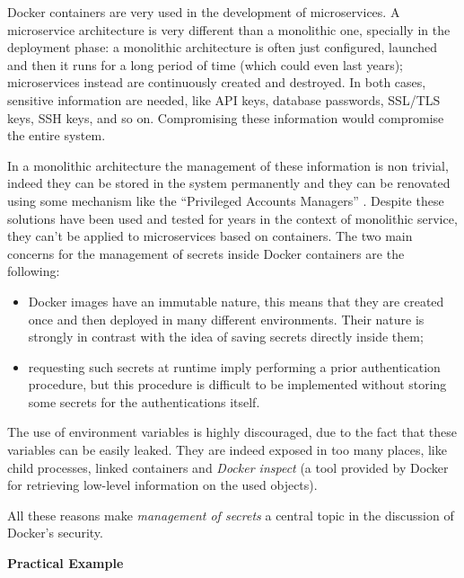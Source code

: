\documentclass[a4paper,12pt]{article}
\begin{document}
Docker containers are very used in the development of microservices. A
microservice architecture is very different than a monolithic one, specially in
the deployment phase: a monolithic architecture is often just configured,
launched and then it runs for a long period of time (which could even last
years); microservices instead are continuously created and destroyed. In both cases,
sensitive information are needed, like API keys, database passwords, SSL/TLS
keys, SSH keys, and so on. Compromising these information would compromise the entire
system. \par In a monolithic architecture the management of these information is
non trivial, indeed they can be stored in the system permanently and they can be
renovated using some mechanism like the ``Privileged Accounts Managers''
\cite{privileged_accounts_managers}. Despite these solutions have been used and
tested for years in the context of monolithic service, they can't be applied to
microservices based on containers. The two main concerns for the management of
secrets inside Docker containers are the following\cite{secret_management_concerns_docker}:
\begin{itemize}
  \item Docker images have an immutable nature, this means that they are created
  once and then deployed in many different environments. Their nature is
  strongly in contrast with the idea of saving secrets directly inside them;  
  \item requesting such secrets at runtime imply performing a prior
  authentication procedure, but this procedure is difficult to be implemented
  without storing some secrets for the authentications itself.
\end{itemize}
The use of environment variables is highly discouraged, due to the fact that
these variables can be easily leaked. They are indeed exposed in too many
places, like child processes, linked containers and \textit{Docker inspect} (a
tool provided by Docker for retrieving low-level information on the used
objects).\par All these reasons make \textit{management of secrets} a central
topic in the discussion of Docker's security. 

\bigbreak\textbf{Practical Example}\bigbreak 
\end{document}
